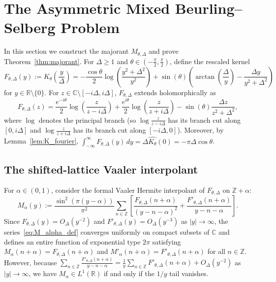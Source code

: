 \documentclass[11pt,a4paper]{amsart}
\theoremstyle{remark}
\numberwithin{equation}{section}
\newcommand{\R}{\mathbb{R}}
\newcommand{\C}{\mathbb{C}}
\newcommand{\Z}{\mathbb{Z}}
\begin{document}
\section{The Asymmetric Mixed Beurling--Selberg Problem}\label{sec:extremal}

In this section we construct the majorant $M_{\theta,\Delta}$ and prove Theorem~\ref{thm:majorant}. For $\Delta \ge 1$ and $\theta \in (-\frac{\pi}{2},\frac{\pi}{2})$, define the rescaled kernel
\begin{equation}\label{eq:F_def}
  F_{\theta,\Delta}(y) := K_\theta\!\left(\frac{y}{\Delta}\right) = -\frac{\cos\theta}{2}\log\!\left(\frac{y^2+\Delta^2}{y^2}\right) + \sin(\theta)\left(\arctan\!\left(\frac{\Delta}{y}\right) - \frac{\Delta y}{y^2+\Delta^2}\right)
\end{equation}
for $y \in \R\setminus\{0\}$. For $z \in \C\setminus[-i\Delta, i\Delta]$, $F_{\theta,\Delta}$ extends holomorphically as
\begin{equation}\label{eq:F_holo}
  F_{\theta,\Delta}(z) = \frac{e^{-i\theta}}{2}\log\!\left(\frac{z}{z-i\Delta}\right) + \frac{e^{i\theta}}{2}\log\!\left(\frac{z}{z+i\Delta}\right) - \sin(\theta)\frac{\Delta z}{z^2+\Delta^2},
\end{equation}
where $\log$ denotes the principal branch (so $\log\frac{z}{z-i\Delta}$ has its branch cut along $[0,i\Delta]$ and $\log\frac{z}{z+i\Delta}$ has its branch cut along $[-i\Delta,0]$). Moreover, by Lemma~\ref{lem:K_fourier}, $\int_{-\infty}^\infty F_{\theta,\Delta}(y)\,dy = \Delta\widehat{K_\theta}(0) = -\pi\Delta\cos\theta$.

\subsection{The shifted-lattice Vaaler interpolant}
For $\alpha \in (0,1)$, consider the formal Vaaler Hermite interpolant of $F_{\theta,\Delta}$ on $\Z + \alpha$:
\begin{equation}\label{eq:M_alpha_def}
  M_\alpha(y) := \frac{\sin^2(\pi(y-\alpha))}{\pi^2}\sum_{n \in \Z}\left[\frac{F_{\theta,\Delta}(n+\alpha)}{(y-n-\alpha)^2} + \frac{F'_{\theta,\Delta}(n+\alpha)}{y-n-\alpha}\right].
\end{equation}
Since $F_{\theta,\Delta}(y) = O_\Delta(y^{-2})$ and $F'_{\theta,\Delta}(y) = O_\Delta(y^{-3})$ as $|y|\to\infty$, the series~\eqref{eq:M_alpha_def} converges uniformly on compact subsets of $\C$ and defines an entire function of exponential type $2\pi$ satisfying $M_\alpha(n+\alpha) = F_{\theta,\Delta}(n+\alpha)$ and $M'_\alpha(n+\alpha) = F'_{\theta,\Delta}(n+\alpha)$ for all $n \in \Z$. However, because $\sum_{n\in\Z} \frac{F'_{\theta,\Delta}(n+\alpha)}{y-n-\alpha} = \frac{1}{y}\sum_{n\in\Z} F'_{\theta,\Delta}(n+\alpha) + O_\Delta(y^{-2})$ as $|y|\to\infty$, we have $M_\alpha \in L^1(\R)$ if and only if the $1/y$ tail vanishes.
\end{document}
